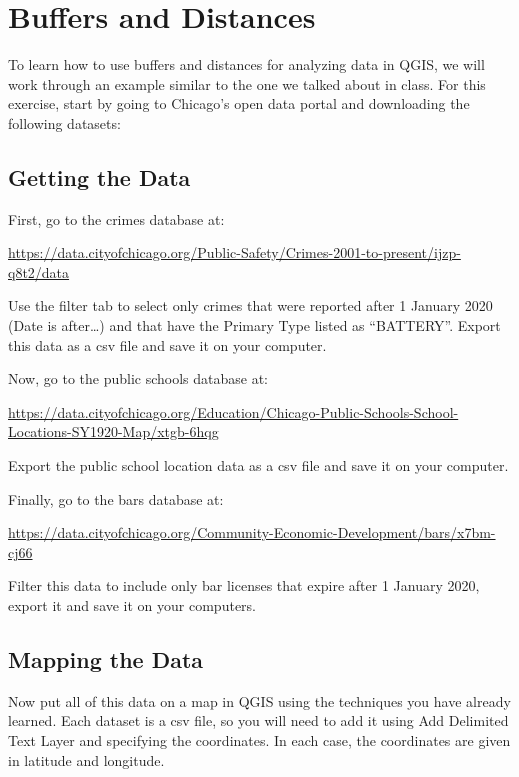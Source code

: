 \documentclass[]{book}
\begin{document}
\hypertarget{buffers-distances}{%
\chapter{Buffers and Distances}\label{buffers-distances}}

To learn how to use buffers and distances for analyzing data in QGIS, we will work through an example similar to the one we talked about in class. For this exercise, start by going to Chicago's open data portal and downloading the following datasets:

\hypertarget{getting-the-data}{%
\section{Getting the Data}\label{getting-the-data}}

First, go to the crimes database at:

\url{https://data.cityofchicago.org/Public-Safety/Crimes-2001-to-present/ijzp-q8t2/data}

Use the filter tab to select only crimes that were reported after 1 January 2020 (Date is after\ldots{}) and that have the Primary Type listed as ``BATTERY''. Export this data as a csv file and save it on your computer.

Now, go to the public schools database at:

\url{https://data.cityofchicago.org/Education/Chicago-Public-Schools-School-Locations-SY1920-Map/xtgb-6hqg}

Export the public school location data as a csv file and save it on your computer.

Finally, go to the bars database at:

\url{https://data.cityofchicago.org/Community-Economic-Development/bars/x7bm-cj66}

Filter this data to include only bar licenses that expire after 1 January 2020, export it and save it on your computers.

\hypertarget{mapping-the-data}{%
\section{Mapping the Data}\label{mapping-the-data}}

Now put all of this data on a map in QGIS using the techniques you have already learned. Each dataset is a csv file, so you will need to add it using Add Delimited Text Layer and specifying the coordinates. In each case, the coordinates are given in latitude and longitude.
\end{document}
